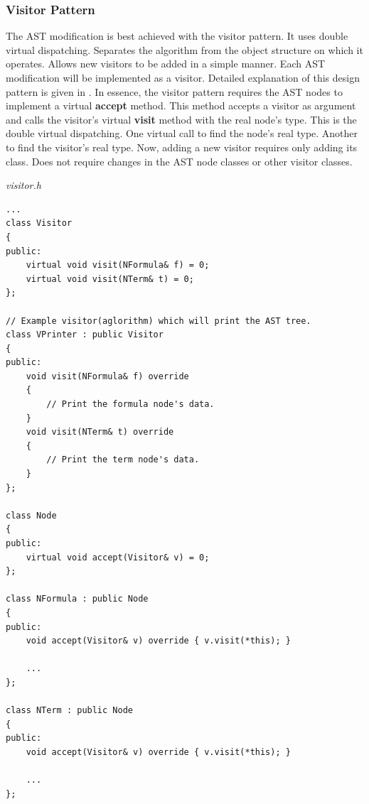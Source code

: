 \documentclass{article}
\begin{document}

	\subsubsection{Visitor Pattern} The AST modification is best achieved with the visitor pattern. It uses double virtual dispatching. Separates the algorithm from the object structure on which it operates. Allows new visitors to be added in a simple manner. Each AST modification will be implemented as a visitor. Detailed explanation of this design pattern is given in \cite{visitor-pattern}. In essence, the visitor pattern requires the AST nodes to implement a virtual \textbf{accept} method. This method accepts a visitor as argument and calls the visitor's virtual \textbf{visit} method with the real node's type. This is the double virtual dispatching. One virtual call to find the node's real type. Another to find the visitor's real type. Now, adding a new visitor requires only adding its class. Does not require changes in the AST node classes or other visitor classes.

\newpage
\noindent
\textit{visitor.h}
\begin{lstlisting}
...
class Visitor
{
public:
    virtual void visit(NFormula& f) = 0;
    virtual void visit(NTerm& t) = 0;
};

// Example visitor(aglorithm) which will print the AST tree.
class VPrinter : public Visitor
{
public:
    void visit(NFormula& f) override
    {
        // Print the formula node's data.
    }
    void visit(NTerm& t) override
    {
        // Print the term node's data.
    }
};

class Node
{
public:
    virtual void accept(Visitor& v) = 0;
};

class NFormula : public Node
{
public:
    void accept(Visitor& v) override { v.visit(*this); }

    ...
};

class NTerm : public Node
{
public:
    void accept(Visitor& v) override { v.visit(*this); }

    ...
};
\end{lstlisting}
\end{document}
